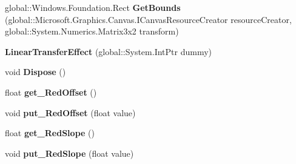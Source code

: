 \begin{DoxyCompactItemize}
\item 
\mbox{\label{class_microsoft_1_1_graphics_1_1_canvas_1_1_effects_1_1_linear_transfer_effect_a18b1ccc429d27cfdd87cfdc6d79203ee}} 
global\+::\+Windows.\+Foundation.\+Rect {\bfseries Get\+Bounds} (global\+::\+Microsoft.\+Graphics.\+Canvas.\+I\+Canvas\+Resource\+Creator resource\+Creator, global\+::\+System.\+Numerics.\+Matrix3x2 transform)
\item 
\mbox{\label{class_microsoft_1_1_graphics_1_1_canvas_1_1_effects_1_1_linear_transfer_effect_ab618808a7f44e9188b529ade14052be5}} 
{\bfseries Linear\+Transfer\+Effect} (global\+::\+System.\+Int\+Ptr dummy)
\item 
\mbox{\label{class_microsoft_1_1_graphics_1_1_canvas_1_1_effects_1_1_linear_transfer_effect_a6b4b889a528c6743eee4a283fe67892a}} 
void {\bfseries Dispose} ()
\item 
\mbox{\label{class_microsoft_1_1_graphics_1_1_canvas_1_1_effects_1_1_linear_transfer_effect_ac7da84c5d5faac56ac8c6beb8c935d23}} 
float {\bfseries get\+\_\+\+Red\+Offset} ()
\item 
\mbox{\label{class_microsoft_1_1_graphics_1_1_canvas_1_1_effects_1_1_linear_transfer_effect_a6d4d761ad4b3ae015d3724f417618963}} 
void {\bfseries put\+\_\+\+Red\+Offset} (float value)
\item 
\mbox{\label{class_microsoft_1_1_graphics_1_1_canvas_1_1_effects_1_1_linear_transfer_effect_a6dc37edf11a2d5e95fababcfe4795a5f}} 
float {\bfseries get\+\_\+\+Red\+Slope} ()
\item 
\mbox{\label{class_microsoft_1_1_graphics_1_1_canvas_1_1_effects_1_1_linear_transfer_effect_a878367955d22fb27da4bafaf3fdf6e75}} 
void {\bfseries put\+\_\+\+Red\+Slope} (float value)

\end{DoxyCompactItemize}
